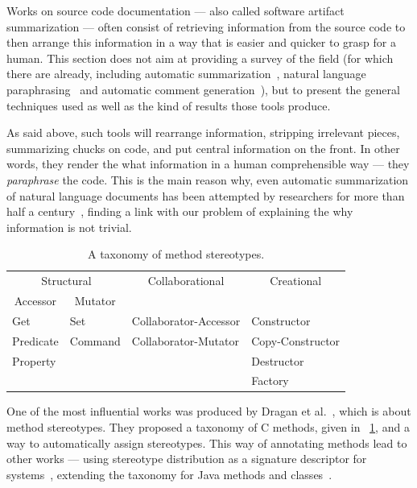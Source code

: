 \documentclass[11pt]{sdm_internship}
\newcommand\CC{C\nolinebreak[4]\hspace{-.05em}\raisebox{.4ex}{\relsize{-3}{\textbf{++}}}}
\theoremstyle{definition}
\begin{document}
Works on source code documentation --- also called software artifact summarization --- often consist of retrieving information from the source code to then arrange this information in a way that is easier and quicker to grasp for a human.
This section does not aim at providing a survey of the field (for which there are already, including automatic summarization~\cite{jones2007automatic,nazar2016summarizing}, natural language paraphrasing~\cite{neubig2016survey} and automatic comment generation~\cite{wang2018comment}), but to present the general techniques used as well as the kind of results those tools produce.

As said above, such tools will rearrange information, stripping irrelevant pieces, summarizing chucks on code, and put central information on the front.
In other words, they render the what information in a human comprehensible way --- they \emph{paraphrase} the code.
This is the main reason why, even automatic summarization of natural language documents has been attempted by researchers for more than half a century~\cite{jones2007automatic}, finding a link with our problem of explaining the why information is not trivial.

\begin{table}
  \centering
  \begin{tabular}{llll}
    \toprule
    \multicolumn{2}{c}{Structural} & \multicolumn{1}{c}{Collaborational} & \multicolumn{1}{c}{Creational} \\
    \multicolumn{1}{c}{Accessor} & \multicolumn{1}{c}{Mutator} & & \\
    \midrule
    Get & Set & Collaborator-Accessor & Constructor \\
    Predicate & Command & Collaborator-Mutator & Copy-Constructor \\
    Property & & & Destructor \\
     & & & Factory \\
    \bottomrule
  \end{tabular}
  \caption{A taxonomy of method stereotypes.}%
  \label{tab:dragan_taxonomy}
\end{table}

One of the most influential works was produced by Dragan et al.~\cite{dragan2006reverse,dragan2011emergent}, which is about method stereotypes.
They proposed a taxonomy of \CC{} methods, given in \tablename~\ref{tab:dragan_taxonomy}, and a way to automatically assign stereotypes.
This way of annotating methods lead to other works --- using stereotype distribution as a signature descriptor for systems~\cite{dragan2009using}, extending the taxonomy for Java methods and classes~\cite{moreno2012jstereocode}.
\end{document}
